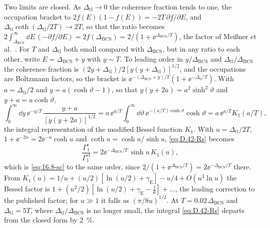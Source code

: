 Two limits are closed. As $\Delta_{\mathrm{tl}} \to 0$ the coherence fraction tends to one, the occupation bracket to $2f(E)(1 - f(E)) = -2T\,\partial f/\partial E$, and $\Delta_{\mathrm{tl}}\coth(\Delta_{\mathrm{tl}}/2T) \to 2T$, so that the ratio becomes $2\int_{\Delta_{\mathrm{BCS}}}^\infty\dd E\,(-\partial f/\partial E) = 2f(\Delta_{\mathrm{BCS}}) = 2/(1 + \ee^{\Delta_{\mathrm{BCS}}/T})$, the factor of Meißner et al.~\cite[Eq.~(9)]{meissner2021acoustic}. For $T$ and $\Delta_{\mathrm{tl}}$ both small compared with $\Delta_{\mathrm{BCS}}$, but in any ratio to each other, write $E = \Delta_{\mathrm{BCS}} + y$ with $y \sim T$. To leading order in $y/\Delta_{\mathrm{BCS}}$ and $\Delta_{\mathrm{tl}}/\Delta_{\mathrm{BCS}}$ the coherence fraction is $(2y + \Delta_{\mathrm{tl}})/2[y(y + \Delta_{\mathrm{tl}})]^{1/2}$, and the occupations are Boltzmann factors, so the bracket is $\ee^{-(\Delta_{\mathrm{BCS}} + y)/T}(1 + \ee^{-\Delta_{\mathrm{tl}}/T})$. With $a = \Delta_{\mathrm{tl}}/2$ and $y = a(\cosh\vartheta - 1)$, so that $y(y + 2a) = a^2\sinh^2\vartheta$ and $y + a = a\cosh\vartheta$,
\begin{equation*}
  \int_0^\infty\dd y\,\ee^{-y/T}\,\frac{y + a}{[y(y + 2a)]^{1/2}} = a\,\ee^{a/T}\int_0^\infty\dd\vartheta\,\ee^{-(a/T)\cosh\vartheta}\cosh\vartheta = a\,\ee^{a/T}K_1(a/T) ,
\end{equation*}
the integral representation of the modified Bessel function $K_1$. With $u = \Delta_{\mathrm{tl}}/2T$, $1 + \ee^{-2u} = 2\ee^{-u}\cosh u$ and $\coth u = \cosh u/\sinh u$, \cref{eq:D.42-Rs} becomes
\begin{equation*}
  \frac{\varGamma_1^{\mathrm{s}}}{\varGamma_1^{\mathrm{el}}} = 2\ee^{-\Delta_{\mathrm{BCS}}/T}\,\sinh u\,K_1(u) ,
\end{equation*}
which is \cref{eq:16.8-sc} to the same order, since $2/(1 + \ee^{\Delta_{\mathrm{BCS}}/T}) = 2\ee^{-\Delta_{\mathrm{BCS}}/T}$ there. From $K_1(u) = 1/u + (u/2)[\ln(u/2) + \gamma_{\mathrm{E}}] - u/4 + O(u^3\ln u)$ the Bessel factor is $1 + (u^2/2)[\ln(u/2) + \gamma_{\mathrm{E}} - \tfrac16] + \dots$, the leading correction to the published factor; for $u \gg 1$ it falls as $(\pi/8u)^{1/2}$. At $T = 0.02\,\Delta_{\mathrm{BCS}}$ and $\Delta_{\mathrm{tl}} = 5T$, where $\Delta_{\mathrm{tl}}/\Delta_{\mathrm{BCS}}$ is no longer small, the integral \cref{eq:D.42-Rs} departs from the closed form by \SI{2}{\percent}.
